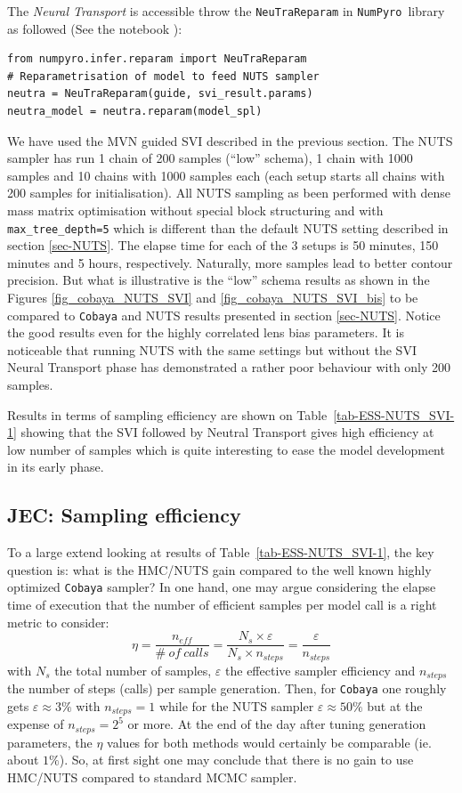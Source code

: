 \documentclass[twocolumn,twocolappendix,nofootinbib,iop]{openjournal}
\newcommand{\nblink}[1]{\href{https://github.com/DifferentiableUniverseInitiative/jax-cosmo-paper/blob/master/notebooks/#1.ipynb}{\faFileCodeO}}
\newcommand{\JEC}[1]{{\color{magenta}JEC: #1}}
\newcommand{\numpyro}{\texttt{NumPyro}}
\begin{document}
The \textit{Neural Transport} is accessible throw the  \verb|NeuTraReparam| in \numpyro\ library as followed (See the notebook \nblink{DES_Y1_SVI_and_NeutraReparam}):
\begin{lstlisting}[language=iPython]
from numpyro.infer.reparam import NeuTraReparam
# Reparametrisation of model to feed NUTS sampler
neutra = NeuTraReparam(guide, svi_result.params)
neutra_model = neutra.reparam(model_spl) 
\end{lstlisting}
%
We have used the MVN guided SVI described in the previous section. The NUTS sampler has run 1 chain of 200 samples (``low'' schema), 1 chain with 1000 samples and 10 chains  with 1000 samples each (each setup starts all chains with 200 samples for initialisation). All NUTS sampling as been performed with dense mass matrix optimisation without special block structuring and with \texttt{max\_tree\_depth=5} which is different than the default NUTS setting described in section \ref{sec-NUTS}. The elapse time for each of the 3 setups is 50 minutes, 150 minutes and 5 hours, respectively. Naturally, more samples lead to better contour precision. But what is illustrative is the ``low'' schema results as shown in the Figures \ref{fig_cobaya_NUTS_SVI} and \ref{fig_cobaya_NUTS_SVI_bis}  to be compared to \texttt{Cobaya} and NUTS results presented in section \ref{sec-NUTS}. Notice the good results even for the highly correlated lens bias parameters. It is noticeable that running NUTS with the same settings  but without the SVI Neural Transport phase has demonstrated a rather poor behaviour with only 200 samples.  

Results in terms of sampling efficiency are shown on Table~\ref{tab-ESS-NUTS_SVI-1} showing that the SVI followed by Neutral Transport gives high efficiency at low number of samples which is quite interesting to ease the model development in its early phase.
%
\subsection{\JEC{Sampling efficiency}}
\label{sec-results}
%
To a large extend looking at results of Table~\ref{tab-ESS-NUTS_SVI-1}, the key question is: what is the HMC/NUTS gain compared to the well known highly optimized \texttt{Cobaya} sampler? 
In one hand, one may argue considering the elapse time of execution that the number of efficient samples per model call is a right metric to consider: 
\begin{equation}
    \eta = \frac{n_{eff}}{\#\ of\ calls} = \frac{N_s \times \varepsilon}{N_s \times n_{steps}} = \frac{\varepsilon}{n_{steps}}
\end{equation}
with $N_s$ the total number of samples, $\varepsilon$ the effective sampler efficiency  and $n_{steps}$ the number of steps (calls) per sample generation. Then, for \texttt{Cobaya} one roughly gets $\varepsilon\approx 3\%$ with $n_{steps}=1$ while for the NUTS sampler $\varepsilon\approx 50\%$ but at the expense of $n_{steps}=2^5$ or more. At the end of the day after tuning generation parameters, the $\eta$ values for both methods would certainly be comparable (ie. about $1\%$). So, at first sight one may conclude that there is no gain to use HMC/NUTS compared to standard MCMC sampler.  
\end{document}
